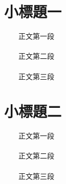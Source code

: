 \section{小標題一}

　　正文第一段
\\\\
　　正文第二段
\\\\
　　正文第三段

\section{小標題二}

　　正文第一段
\\\\
　　正文第二段
\\\\
　　正文第三段